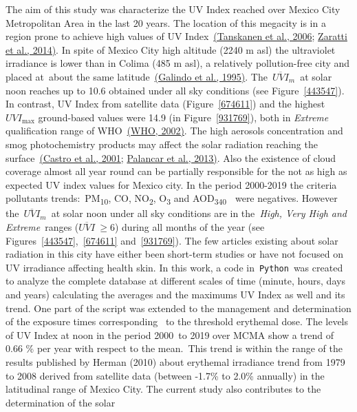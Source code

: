 \documentclass[10pt]{article}
\begin{document}
{\label{507127}}

The aim of this study was characterize the UV Index reached over Mexico
City Metropolitan Area in the last 20 years. The location of this
megacity is in a region prone to achieve high values of UV
Index~\hyperref[csl:27]{(Tanskanen et al., 2006}; \hyperref[csl:26]{Zaratti et al., 2014)}. In spite of Mexico City high altitude (2240 m
asl) the ultraviolet irradiance is lower than in Colima (485 m asl), a
relatively pollution-free city and placed at~about the same
latitude~\hyperref[csl:19]{(Galindo et al., 1995)}. The~\(\overline{UVI}_m\)~at solar noon
reaches up to 10.6 obtained under all sky conditions (see
Figure~{\ref{443547}}). In contrast, UV Index from
satellite data (Figure~{\ref{674611}}) and the
highest~\(UVI_{\max}\) ground-based values were 14.9 (in
Figure~{\ref{931769}}), both in \emph{Extreme}
qualification range of WHO~\hyperref[csl:24]{(WHO, 2002)}. The high aerosols
concentration and smog photochemistry products may affect the solar
radiation reaching the surface~\hyperref[csl:14]{(Castro et al., 2001}; \hyperref[csl:13]{Palancar et al., 2013)}. Also the existence of
cloud coverage almost all year round can be partially responsible for
the not as high as expected UV index values for Mexico city. In the
period 2000-2019 the criteria pollutants trends:~PM\textsubscript{10},
CO, NO\textsubscript{2}, O\textsubscript{3} and
AOD\textsubscript{340~}~were negatives. However
the~\(\overline{UVI}_m\)~at solar noon under all sky conditions are in
the\emph{~High, Very High and Extreme}~ranges (\(\overline{UVI}\ \ge6\))
during all months of the year (see
Figures~{\ref{443547}},~{\ref{674611}}
and~{\ref{931769}}). The few articles existing about
solar radiation in this city have either been short-term studies or have
not focused on UV irradiance affecting health skin. In this work, a code
in~\texttt{Python}~was created to analyze the complete database at
different scales of time (minute, hours, days and years) calculating the
averages and the maximums UV Index as well and its trend. One part of
the script was extended to the management and determination of the
exposure times corresponding~ to the threshold erythemal dose. The
levels of UV Index at noon in the period 2000~to 2019 over MCMA show a
trend of 0.66 \% per year with respect to the mean.~This trend is within
the range of the results published by Herman (2010) about erythemal
irradiance trend from 1979 to 2008 derived from satellite data (between
-1.7\% to 2.0\% annually) in the latitudinal range of Mexico City. The
current study also contributes to the determination of the solar
\end{document}
